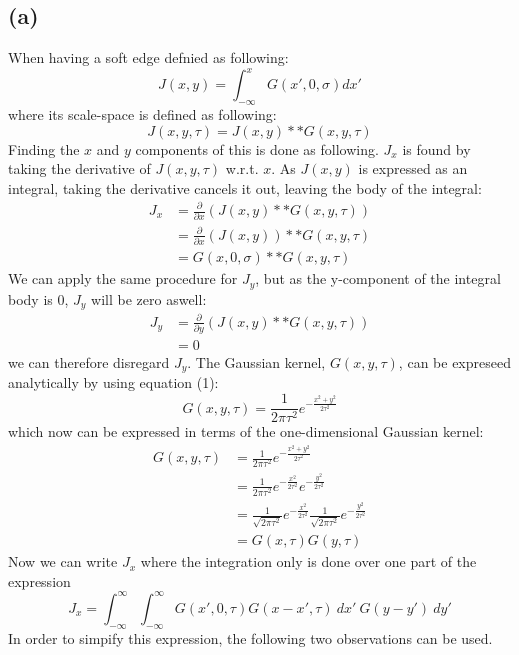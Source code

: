 \documentclass[a4paper]{article}
\begin{document}
\subsection*{(a)}
When having a soft edge defnied as following:
$$
  J(x,y)=\int^{x}_{-\infty} G(x',0,\sigma)dx'
$$
where its scale-space is defined as following:
$$
  J(x,y,\tau)=J(x,y)**G(x,y,\tau)
$$
Finding the $x$ and $y$ components of this is done as following. $J_x$ is found by taking the derivative of $J(x,y,\tau)$ w.r.t. $x$. As $J(x,y)$ is expressed as an integral, taking the derivative cancels it out, leaving the body of the integral:
\begin{align*}
  J_x &= \frac{\partial}{\partial x}(J(x,y) ** G(x,y,\tau)) \\
      &= \frac{\partial}{\partial x} (J(x,y)) ** G(x,y,\tau) \\
      &= G(x,0,\sigma) ** G(x,y,\tau)
\end{align*}
We can apply the same procedure for $J_y$, but as the y-component of the integral body is $0$, $J_y$ will be zero aswell:
\begin{align*}
  J_y &= \frac{\partial}{\partial y}(J(x,y) ** G(x,y,\tau)) \\
      &= 0
\end{align*}
we can therefore disregard $J_y$. The Gaussian kernel, $G(x,y,\tau)$, can be expreseed analytically by using equation (1):
$$
  G(x,y,\tau) = \frac{1}{2\pi \tau^2} e^{-\frac{x^2+y^2}{2\tau^2} }
$$
which now can be expressed in terms of the one-dimensional Gaussian kernel:
\begin{align*}
  G(x,y,\tau) &= \frac{1}{2\pi \tau^2} e^{-\frac{x^2+y^2}{2\tau^2} } \\
              &= \frac{1}{2\pi \tau^2} e^{-\frac{x^2}{2\tau^2} } e^{-\frac{y^2}{2\tau^2} }\\
              &= \frac{1}{\sqrt{2\pi \tau^2}} e^{-\frac{x^2}{2\tau^2} } \frac{1}{\sqrt{2\pi \tau^2}} e^{-\frac{y^2}{2\tau^2} }\\
              &= G(x,\tau)G(y,\tau)
\end{align*}
Now we can write $J_x$ where the integration only is done over one part of the expression
$$
J_x = \int_{-\infty}^{\infty}\int_{-\infty}^{\infty} G(x', 0,\tau) G(x-x',\tau) \:dx' \: G(y-y')\: dy'
$$
In order to simpify this expression, the following two observations can be used.
\end{document}
